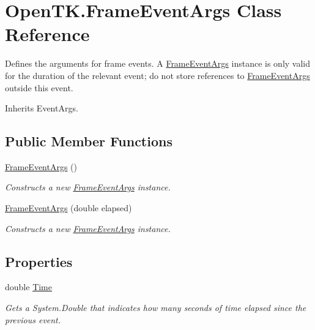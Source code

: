 \hypertarget{class_open_t_k_1_1_frame_event_args}{\section{Open\-T\-K.\-Frame\-Event\-Args Class Reference}
\label{class_open_t_k_1_1_frame_event_args}
}


Defines the arguments for frame events. A \hyperlink{class_open_t_k_1_1_frame_event_args}{Frame\-Event\-Args} instance is only valid for the duration of the relevant event; do not store references to \hyperlink{class_open_t_k_1_1_frame_event_args}{Frame\-Event\-Args} outside this event.  




Inherits Event\-Args.

\subsection*{Public Member Functions}
\begin{DoxyCompactItemize}
\item 
\hyperlink{class_open_t_k_1_1_frame_event_args_a9d439a35fcccc0e499a0e79c31db0d76}{Frame\-Event\-Args} ()
\begin{DoxyCompactList}\small\item\em Constructs a new \hyperlink{class_open_t_k_1_1_frame_event_args}{Frame\-Event\-Args} instance. \end{DoxyCompactList}\item 
\hyperlink{class_open_t_k_1_1_frame_event_args_aca23078ed1cdd7c0de8a62cdf0ad68f6}{Frame\-Event\-Args} (double elapsed)
\begin{DoxyCompactList}\small\item\em Constructs a new \hyperlink{class_open_t_k_1_1_frame_event_args}{Frame\-Event\-Args} instance. \end{DoxyCompactList}\end{DoxyCompactItemize}
\subsection*{Properties}
\begin{DoxyCompactItemize}
\item 
double \hyperlink{class_open_t_k_1_1_frame_event_args_aee05f4349255e7798599c301759d6211}{Time}
\begin{DoxyCompactList}\small\item\em Gets a System.\-Double that indicates how many seconds of time elapsed since the previous event. \end{DoxyCompactList}\end{DoxyCompactItemize}


